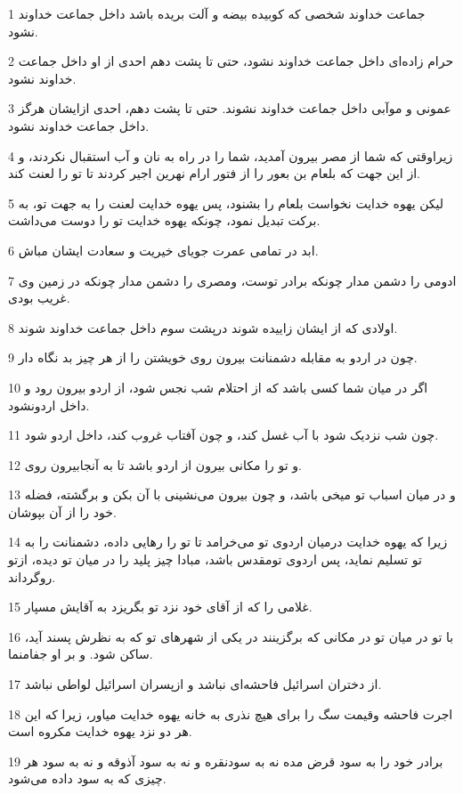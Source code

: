 \par 1 جماعت خداوند شخصی که کوبیده بیضه و آلت بریده باشد داخل جماعت خداوند نشود.
\par 2 حرام زاده‌ای داخل جماعت خداوند نشود، حتی تا پشت دهم احدی از او داخل جماعت خداوند نشود.
\par 3 عمونی و موآبی داخل جماعت خداوند نشوند. حتی تا پشت دهم، احدی ازایشان هرگز داخل جماعت خداوند نشود.
\par 4 زیراوقتی که شما از مصر بیرون آمدید، شما را در راه به نان و آب استقبال نکردند، و از این جهت که بلعام بن بعور را از فتور ارام نهرین اجیر کردند تا تو را لعنت کند.
\par 5 لیکن یهوه خدایت نخواست بلعام را بشنود، پس یهوه خدایت لعنت را به جهت تو، به برکت تبدیل نمود، چونکه یهوه خدایت تو را دوست می‌داشت.
\par 6 ابد در تمامی عمرت جویای خیریت و سعادت ایشان مباش.
\par 7 ادومی را دشمن مدار چونکه برادر توست، ومصری را دشمن مدار چونکه در زمین وی غریب بودی.
\par 8 اولادی که از ایشان زاییده شوند درپشت سوم داخل جماعت خداوند شوند.
\par 9 چون در اردو به مقابله دشمنانت بیرون روی خویشتن را از هر چیز بد نگاه دار.
\par 10 اگر در میان شما کسی باشد که از احتلام شب نجس شود، از اردو بیرون رود و داخل اردونشود.
\par 11 چون شب نزدیک شود با آب غسل کند، و چون آفتاب غروب کند، داخل اردو شود.
\par 12 و تو را مکانی بیرون از اردو باشد تا به آنجابیرون روی.
\par 13 و در میان اسباب تو میخی باشد، و چون بیرون می‌نشینی با آن بکن و برگشته، فضله خود را از آن بپوشان.
\par 14 زیرا که یهوه خدایت درمیان اردوی تو می‌خرامد تا تو را رهایی داده، دشمنانت را به تو تسلیم نماید، پس اردوی تومقدس باشد، مبادا چیز پلید را در میان تو دیده، ازتو روگرداند.
\par 15 غلامی را که از آقای خود نزد تو بگریزد به آقایش مسپار.
\par 16 با تو در میان تو در مکانی که برگزینند در یکی از شهرهای تو که به نظرش پسند آید، ساکن شود. و بر او جفامنما.
\par 17 از دختران اسرائیل فاحشه‌ای نباشد و ازپسران اسرائیل لواطی نباشد.
\par 18 اجرت فاحشه وقیمت سگ را برای هیچ نذری به خانه یهوه خدایت میاور، زیرا که این هر دو نزد یهوه خدایت مکروه است. 
\par 19 برادر خود را به سود قرض مده نه به سودنقره و نه به سود آذوقه و نه به سود هر چیزی که به سود داده می‌شود.
